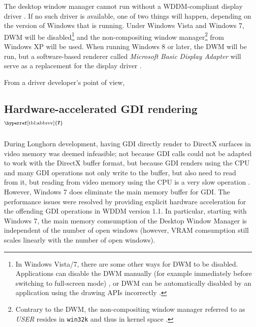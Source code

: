 \documentclass[10pt,twocolumn,a4paper]{article}
\newcommand{\bs}[1]{\textbf{\sffamily #1}}
\newcommand{\winver}[1]{$^{\text{\hyperref[tbl:abbrev]{\bs{#1}}}}$}
\newcommand{\winsubsection}[2]{\subsection[#1]{#1\winver{#2}}}
\begin{document}
			The desktop window manager cannot run without a WDDM-compliant
			display driver \cite{dwmwddm}. If no such driver is available, one
			of two things will happen, depending on the version of Windows that
			is running. Under Windows Vista and Windows 7, DWM will be
			disabled\footnote{In Windows Vista/7, there are some other ways for
			DWM to be disabled. Applications can disable the DWM manually (for
			example immediately before switching to full-screen mode)
			\cite{disabledwm}, or DWM can be automatically disabled by an
			application using the drawing APIs incorrectly \cite{dwmredirect}.}
			and the non-compositing window manager\footnote{Contrary to the DWM,
			the non-compositing window manager referred to as \textit{USER} resides
			in \texttt{win32k} and thus in kernel space \cite{probertwin32k}.}
			from Windows XP will be used. When running Windows 8 or later,
			the DWM will be run, but a software-based renderer called
			\textit{Microsoft Basic Display Adapter} will serve as a replacement
			for the display driver \cite{dwmalwayson}.

			From a driver developer's point of view,
			\cite{wddmarch}

		\winsubsection{Hardware-accelerated GDI ren\-der\-ing}{7}
			During Longhorn development, having GDI directly render to DirectX
			surfaces in video memory was deemed infeasible; not because GDI calls
			could not be adapted to work with the DirectX buffer format, but because
			GDI renders using the CPU and many GDI operations not only write to
			the buffer, but also need to read from it, but reading from video memory
			using the CPU is a very slow operation \cite{dwmredirect}. However,
			Windows 7 does eliminate the main memory buffer for GDI. The performance
			issues were resolved by providing explicit hardware acceleration for
			the offending GDI operations in WDDM version 1.1. In particular,
			starting with Windows 7, the
			main memory comsumption of the Desktop Window Manager is independent
			of the number of open windows (however, VRAM comsumption still scales
			linearly with the number of open windows).
			\cite{win7}

	\onecolumn{\printbibliography}
\end{document}
